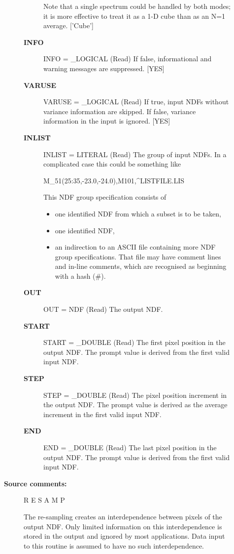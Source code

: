 \begin{description}
\begin{description}
\begin{description}
   Note that a single spectrum could be handled by both modes; it
   is more effective to treat it as a 1-D cube than as an N=1
   average.
   ['Cube']
\item [\textbf{INFO}]
INFO = \_LOGICAL (Read)
   If false, informational and warning messages are suppressed.
   [YES]
\item [\textbf{VARUSE}]
VARUSE = \_LOGICAL (Read)
   If true, input NDFs without variance information are skipped.
   If false, variance information in the input is ignored.
   [YES]
\item [\textbf{INLIST}]
INLIST = LITERAL (Read)
   The group of input NDFs. In a complicated case this could be
   something like
\begin{terminalv}
      M_51(25:35,-23.0,-24.0),M101,^LISTFILE.LIS
\end{terminalv}
   This NDF group specification consists of
\begin{itemize}
   \item  one identified NDF from which a subset is to be taken,
   \item  one identified NDF,
   \item  an indirection to an ASCII file containing more NDF group
      specifications. That file may have comment lines and in-line
      comments, which are recognised as beginning with a hash (\#).
\end{itemize}
\item [\textbf{OUT}]
OUT = NDF (Read)
   The output NDF.
\item [\textbf{START}]
START = \_DOUBLE (Read)
   The first pixel position in the output NDF. The prompt value is
   derived from the first valid input NDF.
\item [\textbf{STEP}]
STEP = \_DOUBLE (Read)
   The pixel position increment in the output NDF. The prompt
   value is derived as the average increment in the first valid
   input NDF.
\item [\textbf{END}]
END = \_DOUBLE (Read)
   The last pixel position in the output NDF. The prompt value is
   derived from the first valid input NDF.

\end{description}

\item [\textbf{Source comments:}]
\begin{terminalv}
   R E S A M P

   The re-sampling creates an interdependence between pixels of the
   output NDF. Only limited information on this interdependence is
   stored in the output and ignored by most applications. Data input
   to this routine is assumed to have no such interdependence.


\end{terminalv}
\end{description}
\end{description}
